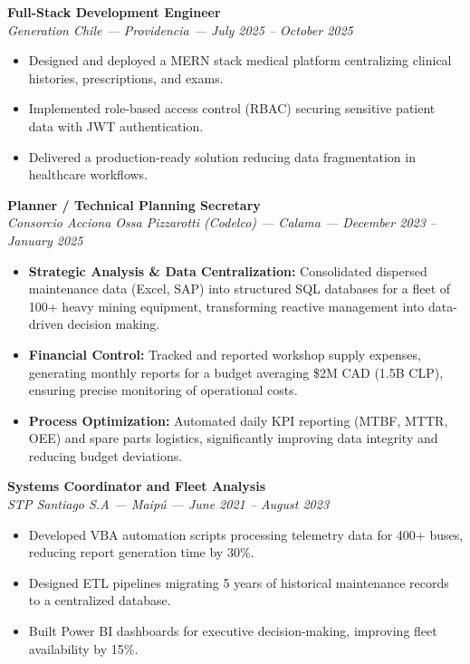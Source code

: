 \documentclass[10pt,letterpaper]{article}
\begin{document}
\noindent \textbf{Full-Stack Development Engineer} \\
\textit{Generation Chile — Providencia — July 2025 – October 2025}
\begin{itemize}
    \item Designed and deployed a MERN stack medical platform centralizing clinical histories, prescriptions, and exams.
    \item Implemented role-based access control (RBAC) securing sensitive patient data with JWT authentication.
    \item Delivered a production-ready solution reducing data fragmentation in healthcare workflows.
\end{itemize}

\vspace{0.2cm}

\noindent \textbf{Planner / Technical Planning Secretary} \\
\textit{Consorcio Acciona Ossa Pizzarotti (Codelco) — Calama — December 2023 – January 2025}
\begin{itemize}
    \item \textbf{Strategic Analysis \& Data Centralization:} Consolidated dispersed maintenance data (Excel, SAP) into structured SQL databases for a fleet of 100+ heavy mining equipment, transforming reactive management into data-driven decision making.
    \item \textbf{Financial Control:} Tracked and reported workshop supply expenses, generating monthly reports for a budget averaging \$2M CAD (1.5B CLP), ensuring precise monitoring of operational costs.
    \item \textbf{Process Optimization:} Automated daily KPI reporting (MTBF, MTTR, OEE) and spare parts logistics, significantly improving data integrity and reducing budget deviations.
\end{itemize}

\vspace{0.2cm}

\noindent \textbf{Systems Coordinator and Fleet Analysis} \\
\textit{STP Santiago S.A — Maipú — June 2021 – August 2023}
\begin{itemize}
    \item Developed VBA automation scripts processing telemetry data for 400+ buses, reducing report generation time by 30\%.
    \item Designed ETL pipelines migrating 5 years of historical maintenance records to a centralized database.
    \item Built Power BI dashboards for executive decision-making, improving fleet availability by 15\%.
\end{itemize}
\end{document}
